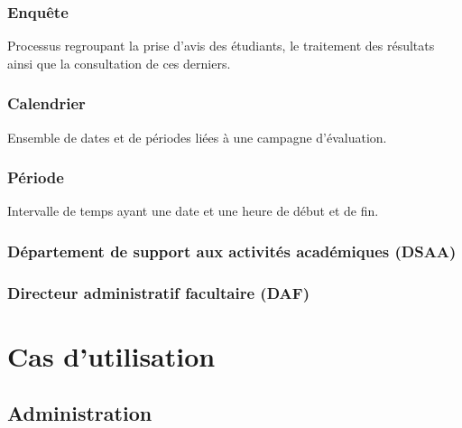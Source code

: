 \documentclass[a4paper,11pt]{report}
\begin{document}
\subsection{Enquête}
Processus regroupant la prise d'avis des étudiants, le traitement des résultats ainsi que la consultation de ces derniers.

\subsection{Calendrier}
Ensemble de dates et de périodes liées à une campagne d'évaluation.

\subsection{Période}
Intervalle de temps ayant une date et une heure de début et de fin.

\subsection{Département de support aux activités académiques (DSAA)}

\subsection{Directeur administratif facultaire (DAF)}














\chapter{Cas d'utilisation}

\section{Administration}
\end{document}
